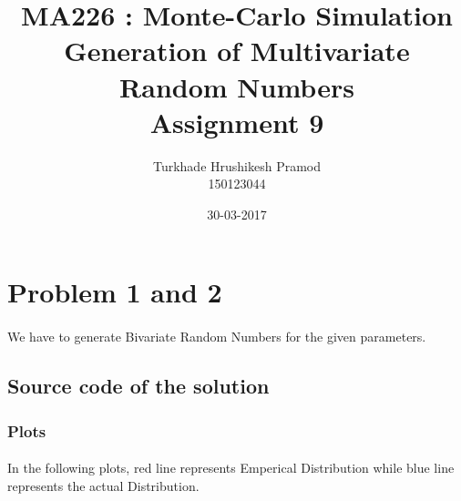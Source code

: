 \documentclass{article}
\title{%
	MA226 : Monte-Carlo Simulation\\
	 Generation of Multivariate Random Numbers\\
	 \large Assignment 9}
\date{30-03-2017}
\author{%
	Turkhade Hrushikesh Pramod\\
	150123044	}
\begin{document}
	\maketitle
	
	\newpage
	
	\section{Problem 1 and 2}
	\paragraph{}
		We have to generate Bivariate Random Numbers for the given parameters.
		
		\paragraph{}
		
			
		
	\subsection{Source code of the solution}
		
		
		\pagebreak
		\subsubsection{Plots}
	
		\paragraph{}
		In the following plots, red line represents Emperical Distribution while blue line represents the actual Distribution.		
		
\end{document}
